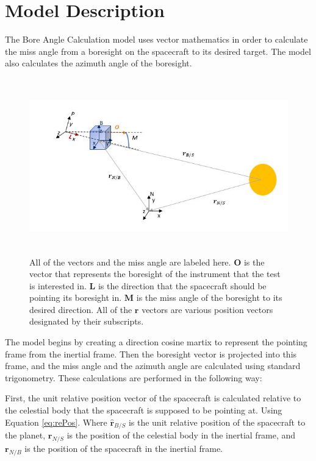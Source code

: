 \section{Model Description}

The Bore Angle Calculation model uses vector mathematics in order to calculate the miss angle from a boresight on the spacecraft to its desired target. The model also calculates the azimuth angle of the boresight.

\begin{figure}[H]
	\centerline{
		 \includegraphics[height = 3in]{Figures/missAngleImg.JPG}
	}
	\caption{All of the vectors and the miss angle are labeled here. $\bm O$ is the vector that represents the boresight of the instrument that the test is interested in. $\bm{L}$ is the direction that the spacecraft should be pointing its boresight in. $\bm M$ is the miss angle of the boresight to its desired direction. All of the $\bm r$ vectors are various position vectors designated by their subscripts.} 
	\label{fig:Fig1}
\end{figure}

The model begins by creating a direction cosine martix to represent the pointing frame from the inertial frame. Then the boresight vector is projected into this frame, and the miss angle and the azimuth angle are calculated using standard trigonometry. These calculations are performed in the following way:

First, the unit relative position vector of the spacecraft is calculated relative to the celestial body that the spacecraft is supposed to be pointing at. Using Equation \ref{eq:rePos}. Where $\hat{\bm r}_{B/S}$ is the unit relative position of the spacecraft to the planet, $\bm r_{N/S}$ is the position of the celestial body in the inertial frame, and $\bm r_{N/B}$ is the position of the spacecraft in the inertial frame. 

